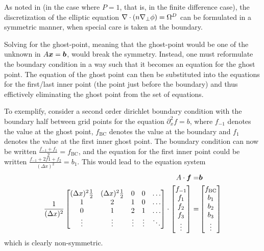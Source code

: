 As noted in \cite{Wiesenberger2014Phd} (in the case where $P=1$, that is, in
the finite difference case), the discretization of the elliptic equation
$\nabla\cdot\left(n\nabla_\perp\phi\right)=\Omega^D$ can be formulated in a symmetric manner,
when special care is taken at the boundary.

Solving for the ghost-point, meaning that the ghost-point would be one of the
unknown in $A\boldsymbol{x}=\boldsymbol{b}$, would break the symmetry. Instead, one must
reformulate the boundary condition in a way such that it becomes an equation
for the ghost point. The equation of the ghost point can then be substituted
into the equations for the first/last inner point (the point just before the
boundary) and thus effictively eliminating the ghost point from the set of
equations.

To exemplify, consider a second order dirichlet boundary condition with the
boundary half between grid points for the equation $\partial_x^2 f = b$, where
$f_{-1}$ denotes the value at the ghost point, $f_{\text{BC}}$ denotes the
value at the boundary and $f_{1}$ denotes the value at the first inner ghost
point. The boundary condition can now be written
$\frac{f_{-1}+f_{1}}{2}=f_{\text{BC}}$, and the equation for the first inner
point could be written $\frac{f_{-1}+2f{1}+f_{2}}{(\Delta x)^2}=b_1$. This
would lead to the equation system
%
\begin{align*}
    A\cdot\boldsymbol{f}=&\boldsymbol{b}\\
    \frac{1}{(\Delta x)^2}
    \begin{bmatrix}
        (\Delta x)^2\frac{1}{2} & (\Delta x)^2\frac{1}{2} & 0 & 0 & \ldots\\
        1                       & 2                       & 1 & 0 & \ldots\\
        0                       & 1                       & 2 & 1 & \ldots\\
        \vdots                  & \vdots              &\vdots&\vdots&\ddots\\
    \end{bmatrix}
    \cdot
    \begin{bmatrix}
        f_{-1}\\
        f_{1}\\
        f_{2}\\
        f_{3}\\
        \vdots
    \end{bmatrix}
    =&
    \begin{bmatrix}
        f_{\text{BC}}\\
        b_{1}\\
        b_{2}\\
        b_{3}\\
        \vdots
    \end{bmatrix}
\end{align*}
%
which is clearly non-symmetric.

